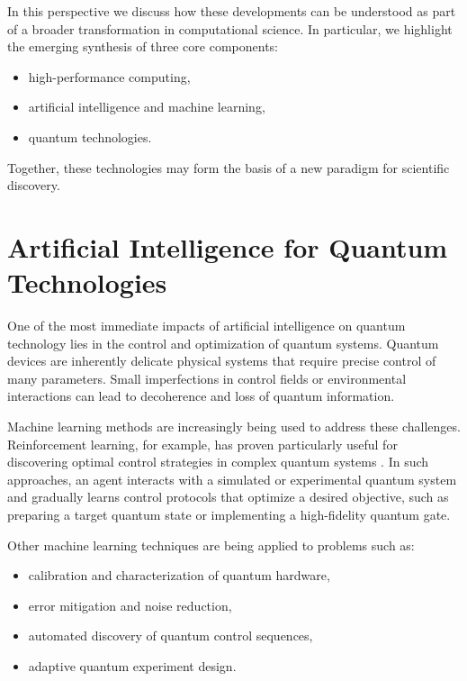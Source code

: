 \documentclass[11pt]{article}
\begin{document}
In this perspective we discuss how these developments can be
understood as part of a broader transformation in computational
science. In particular, we highlight the emerging synthesis of three
core components:

\begin{itemize}
\item high-performance computing,
\item artificial intelligence and machine learning,
\item quantum technologies.
\end{itemize}

Together, these technologies may form the basis of a new paradigm for
scientific discovery.

\section{Artificial Intelligence for Quantum Technologies}

One of the most immediate impacts of artificial intelligence on
quantum technology lies in the control and optimization of quantum
systems. Quantum devices are inherently delicate physical systems that
require precise control of many parameters. Small imperfections in
control fields or environmental interactions can lead to decoherence
and loss of quantum information.

Machine learning methods are increasingly being used to address these
challenges. Reinforcement learning, for example, has proven
particularly useful for discovering optimal control strategies in
complex quantum systems \cite{bukov2026,belliardo2024}. In such
approaches, an agent interacts with a simulated or experimental
quantum system and gradually learns control protocols that optimize a
desired objective, such as preparing a target quantum state or
implementing a high-fidelity quantum gate.

Other machine learning techniques are being applied to problems such as:

\begin{itemize}
\item calibration and characterization of quantum hardware,
\item error mitigation and noise reduction,
\item automated discovery of quantum control sequences,
\item adaptive quantum experiment design.
\end{itemize}
\end{document}
